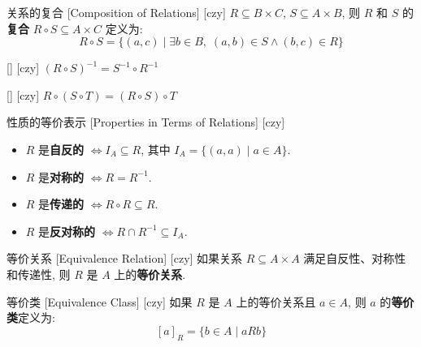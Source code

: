 \documentclass[UTF8]{ctexart}
\begin{document}
        \begin{dfn}
            [UUID]
            {关系的复合}
            [Composition of Relations]
            [czy]
            \( R \subseteq B \times C \), \( S \subseteq A \times B \), 则 \( R \) 和 \( S \) 的\textbf{复合} \( R \circ S \subseteq A \times C \) 定义为: 
            \[
            R \circ S = \{ (a, c) \mid \exists b \in B, \; (a, b) \in S \land (b, c) \in R \}
            \]
        \end{dfn}

        \begin{ppt}
            [UUID]
            {}
            []
            [czy]
            \( {(R \circ S)}^{-1} = S^{-1} \circ R^{-1} \)
        \end{ppt}

        \begin{ppt}
            [UUID]
            {}
            []
            [czy]
            \( R \circ (S \circ T) = (R \circ S) \circ T \)
        \end{ppt}

        \begin{ppt}
            [UUID]
            {性质的等价表示}
            [Properties in Terms of Relations]
            [czy]
            \begin{itemize}
                \item \( R \) 是\textbf{自反的} \( \iff I_A \subseteq R \), 其中 \( I_A = \{ (a, a) \mid a \in A \} \). 
                \item \( R \) 是\textbf{对称的} \( \iff R = R^{-1} \). 
                \item \( R \) 是\textbf{传递的} \( \iff R \circ R \subseteq R \). 
                \item \( R \) 是\textbf{反对称的} \( \iff R \cap R^{-1} \subseteq I_A \). 
            \end{itemize}
        \end{ppt}

        \begin{dfn}
            [UUID]
            {等价关系}
            [Equivalence Relation]
            [czy]
            如果关系 \( R \subseteq A \times A \) 满足自反性、对称性和传递性, 则 \( R \) 是 \( A \) 上的\textbf{等价关系}. 
        \end{dfn}

        \begin{dfn}
            [UUID]
            {等价类}
            [Equivalence Class]
            [czy]
            如果 \( R \) 是 \( A \) 上的等价关系且 \( a \in A \), 则 \( a \) 的\textbf{等价类}定义为: 
            \[
            {[a]}_R = \{ b \in A \mid a R b \}
            \]
        \end{dfn}
\end{document}
